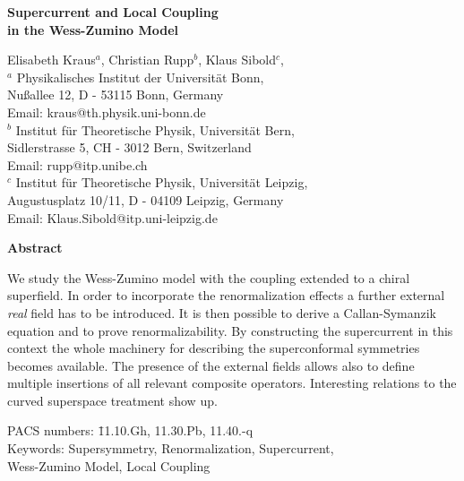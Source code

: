 \documentclass[a4paper,12pt]{article}
\begin{document}
\thispagestyle{empty}

\vspace*{0.1cm}
\begin{center}
{\LARGE \bf Supercurrent and Local Coupling\\[2mm] in the Wess-Zumino
  Model}

\vspace{1cm}

Elisabeth Kraus${}^a$,
Christian Rupp${}^b$, 
Klaus Sibold${}^c$,
\\[0.7cm]
${}^a$ Physikalisches Institut der Universit\"at Bonn,\\
Nu\ss allee 12, D - 53115 Bonn, Germany\\
Email: kraus@th.physik.uni-bonn.de
\\[5mm]
${}^b$ Institut f{\"u}r Theoretische Physik, Universit{\"a}t Bern,\\
Sidlerstrasse 5, CH - 3012 Bern, Switzerland\\
Email: rupp@itp.unibe.ch
\\[5mm]
${}^c$ Institut f{\"u}r Theoretische Physik, Universit{\"a}t Leipzig,\\
Augustusplatz 10/11, D - 04109 Leipzig, Germany\\
Email: Klaus.Sibold@itp.uni-leipzig.de\\ 


\end{center}

\vspace{0.5cm}


\begin{center}
\parbox{12cm}{
\centerline{\small \bf Abstract}
\small \noindent 
We study the Wess-Zumino model with the coupling extended to a chiral
superfield. In order to incorporate the renormalization effects a
further external {\sl real} field  has to be introduced. It is then
possible to derive a Callan-Symanzik equation and to prove renormalizability.
By constructing the supercurrent in this context the whole machinery
for describing the superconformal symmetries becomes available.
The presence of the external fields allows also to define multiple
insertions of all relevant composite operators. Interesting relations
to the curved superspace treatment show up.
}
\end{center}

\vspace*{10mm}
\begin{tabbing}
PACS numbers: \= 11.10.Gh, 11.30.Pb, 11.40.-q\\ 
Keywords:\>
Supersymmetry, Renormalization, 
Supercurrent,\\ \> Wess-Zumino Model, Local Coupling
\end{tabbing}
\newpage
\end{document}
